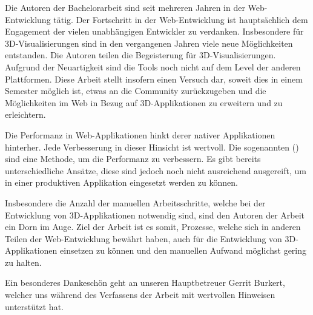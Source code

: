 
Die Autoren der Bachelorarbeit sind seit mehreren Jahren in der Web-Entwicklung tätig. Der Fortschritt in der Web-Entwicklung ist hauptsächlich dem Engagement der vielen unabhängigen Entwickler zu verdanken.
Insbesondere für 3D-Visualisierungen sind in den vergangenen Jahren viele neue Möglichkeiten entstanden. Die Autoren teilen die Begeisterung für 3D-Visualisierungen. Aufgrund der Neuartigkeit sind die Tools noch nicht auf dem Level der anderen Plattformen. Diese Arbeit stellt insofern einen Versuch dar, soweit dies in einem Semester möglich ist, etwas an die Community zurückzugeben und die Möglichkeiten im Web in Bezug auf 3D-Applikationen zu erweitern und zu erleichtern.

Die Performanz in Web-Applikationen hinkt derer nativer Applikationen hinterher. Jede Verbesserung in dieser Hinsicht ist wertvoll. Die sogenannten  () sind eine Methode, um die Performanz zu verbessern. Es gibt bereits unterschiedliche Ansätze, diese sind jedoch noch nicht ausreichend ausgereift, um in einer produktiven Applikation eingesetzt werden zu können.

Insbesondere die Anzahl der manuellen Arbeitsschritte, welche bei der Entwicklung von 3D-Applikationen notwendig sind, sind den Autoren der Arbeit ein Dorn im Auge. Ziel der Arbeit ist es somit, Prozesse, welche sich in anderen Teilen der Web-Entwicklung bewährt haben, auch für die Entwicklung von 3D-Applikationen einsetzen zu können und den manuellen Aufwand möglichst gering zu halten.

Ein besonderes Dankeschön geht an unseren Hauptbetreuer Gerrit Burkert, welcher uns während des Verfassens der Arbeit mit wertvollen Hinweisen unterstützt hat.